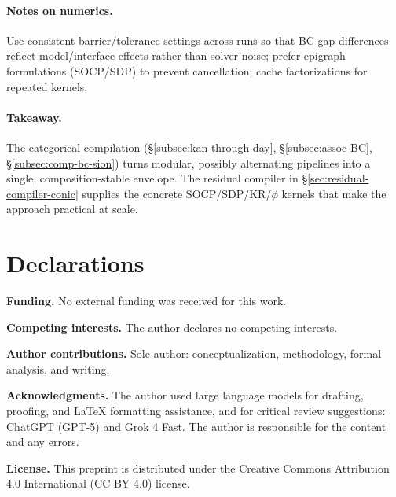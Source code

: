 \documentclass[11pt]{article}
\numberwithin{equation}{section}
\theoremstyle{upright}
\begin{document}
\paragraph{Notes on numerics.}
Use consistent barrier/tolerance settings across runs so that BC-gap differences reflect
model/interface effects rather than solver noise; prefer epigraph formulations (SOCP/SDP)
to prevent cancellation; cache factorizations for repeated kernels.

\paragraph{Takeaway.}
The categorical compilation (\S\ref{subsec:kan-through-day}, \S\ref{subsec:assoc-BC},
\S\ref{subsec:comp-bc-sion}) turns modular, possibly alternating pipelines into a single,
composition-stable envelope. The residual compiler in \S\ref{sec:residual-compiler-conic}
supplies the concrete SOCP/SDP/KR/$\phi$ kernels that make the approach practical at scale.

\section*{Declarations}

\noindent\textbf{Funding.}
No external funding was received for this work.

\medskip
\noindent\textbf{Competing interests.}
The author declares no competing interests.

\medskip
\noindent\textbf{Author contributions.}
Sole author: conceptualization, methodology, formal analysis, and writing.

\medskip
\noindent\textbf{Acknowledgments.}
The author used large language models for drafting, proofing, and \LaTeX{} formatting assistance, and for critical review suggestions: ChatGPT (GPT-5) and Grok 4 Fast. 
The author is responsible for the content and any errors.

\medskip
\noindent\textbf{License.}
This preprint is distributed under the Creative Commons Attribution 4.0 International (CC BY 4.0) license.



\end{document}
